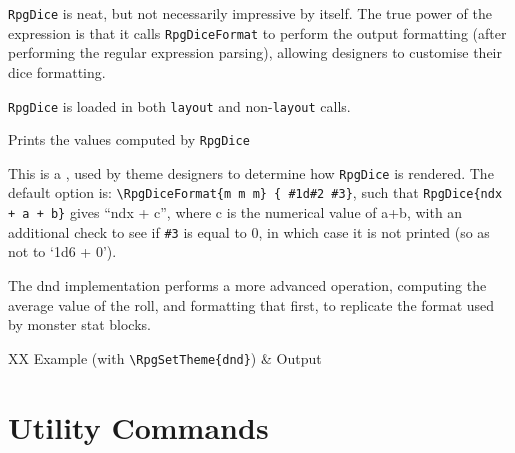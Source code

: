 \begin{macrolist}
{					\verb|RpgDice| is neat, but not necessarily impressive by itself. The true power of the expression is that it calls \verb|RpgDiceFormat| to perform the output formatting (after performing the regular expression parsing), allowing designers to customise their dice formatting.

					\verb|RpgDice| is loaded in both \verb|layout| and non-\verb|layout| calls.
				}
		
				{\label{Macro:DiceFormat} Prints the values computed by \verb|RpgDice|
				}
				{
				}
				{
					This is a \placeholderCommand{}, used by theme designers to determine how \verb|RpgDice| is rendered. The default option is:
					\verb|\RpgDiceFormat{m m m} { #1d#2 #3}|, such that \verb|RpgDice{ndx + a + b}| gives ``ndx + c'', where c is the numerical value of a+b, with an additional check to see if \verb|#3| is equal to 0, in which case it is not printed (so as not to `1d6 + 0'). 
					
					The dnd implementation performs a more advanced operation, computing the average value of the roll, and formatting that first, to replicate the format used by monster stat blocks. 


					
					\begin{RpgTable}{XX}
						Example (with \verb|\RpgSetTheme{dnd}|) & Output \\
					\end{RpgTable}

				
				}
		\end{macrolist}


	\section{Utility Commands}

